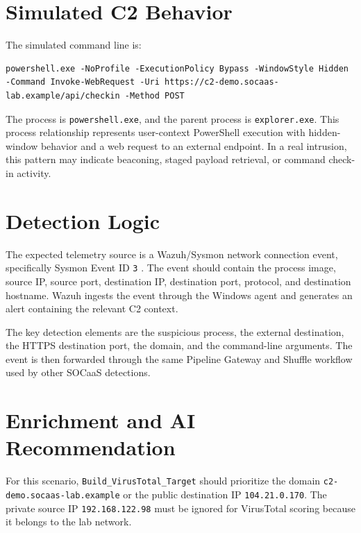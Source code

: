 \section{Simulated C2 Behavior}
\label{sec:annex-b-simulated-c2-behavior}

The simulated command line is:

\begin{verbatim}
powershell.exe -NoProfile -ExecutionPolicy Bypass -WindowStyle Hidden -Command Invoke-WebRequest -Uri https://c2-demo.socaas-lab.example/api/checkin -Method POST
\end{verbatim}

The process is \texttt{powershell.exe}, and the parent process is \texttt{explorer.exe}. This process relationship represents user-context PowerShell execution with hidden-window behavior and a web request to an external endpoint. In a real intrusion, this pattern may indicate beaconing, staged payload retrieval, or command check-in activity.

\section{Detection Logic}
\label{sec:annex-b-detection-logic}

The expected telemetry source is a Wazuh/Sysmon network connection event, specifically Sysmon Event ID \texttt{3} \cite{ch4-sysmon-docs,ch4-wazuh-agent-docs}. The event should contain the process image, source IP, source port, destination IP, destination port, protocol, and destination hostname. Wazuh ingests the event through the Windows agent and generates an alert containing the relevant C2 context.

The key detection elements are the suspicious process, the external destination, the HTTPS destination port, the domain, and the command-line arguments. The event is then forwarded through the same Pipeline Gateway and Shuffle workflow used by other SOCaaS detections.

\section{Enrichment and AI Recommendation}
\label{sec:annex-b-enrichment-and-ai-recommendation}

For this scenario, \texttt{Build\_VirusTotal\_Target} should prioritize the domain \texttt{c2-demo.socaas-lab.example} or the public destination IP \texttt{104.21.0.170}. The private source IP \texttt{192.168.122.98} must be ignored for VirusTotal scoring because it belongs to the lab network.

